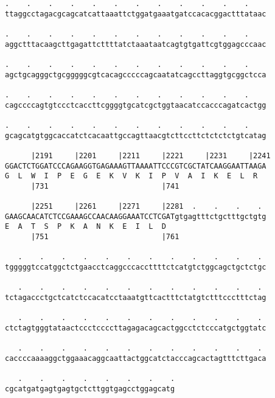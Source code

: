 \documentclass{article}
\begin{document}
\begin{Verbatim}
.    .    .    .    .    .    .    .    .    .    .    .    
ttaggcctagacgcagcatcattaaattctggatgaaatgatccacacggactttataac
                                                            
.    .    .    .    .    .    .    .    .    .    .    .    
aggctttacaagcttgagattcttttatctaaataatcagtgtgattcgtggagcccaac
                                                            
.    .    .    .    .    .    .    .    .    .    .    .    
agctgcagggctgcgggggcgtcacagcccccagcaatatcagccttaggtgcggctcca
                                                            
.    .    .    .    .    .    .    .    .    .    .    .    
cagccccagtgtccctcaccttcggggtgcatcgctggtaacatccacccagatcactgg
                                                            
.    .    .    .    .    .    .    .    .    .    .    .    
gcagcatgtggcaccatctcacaattgccagttaacgtcttccttctctctctgtcatag
                                                            
      |2191     |2201     |2211     |2221     |2231     |2241
GGACTCTGGATCCCAGAAGGTGAGAAAGTTAAAATTCCCGTCGCTATCAAGGAATTAAGA
G  L  W  I  P  E  G  E  K  V  K  I  P  V  A  I  K  E  L  R  
      |731                          |741                    
  
      |2251     |2261     |2271     |2281  .    .    .    . 
GAAGCAACATCTCCGAAAGCCAACAAGGAAATCCTCGATgtgagtttctgctttgctgtg
E  A  T  S  P  K  A  N  K  E  I  L  D                       
      |751                          |761                    
  
   .    .    .    .    .    .    .    .    .    .    .    . 
tgggggtccatggctctgaacctcaggcccaccttttctcatgtctggcagctgctctgc
                                                            
   .    .    .    .    .    .    .    .    .    .    .    . 
tctagaccctgctcatctccacatcctaaatgttcactttctatgtctttccctttctag
                                                            
   .    .    .    .    .    .    .    .    .    .    .    . 
ctctagtgggtataactccctccccttagagacagcactggcctctcccatgctggtatc
                                                            
   .    .    .    .    .    .    .    .    .    .    .    . 
caccccaaaaggctggaaacaggcaattactggcatctacccagcactagtttcttgaca
                                                            
   .    .    .    .    .    .    .    .
cgcatgatgagtgagtgctcttggtgagcctggagcatg
                                       

\end{Verbatim}
\end{document}
